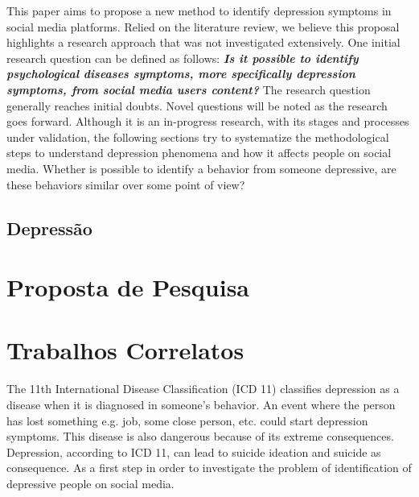 \documentclass[11pt, notitlepage]{article} %
\begin{document}
This paper aims to propose a new method to identify depression symptoms in social media platforms. Relied on the literature review, we believe this proposal highlights a research approach that was not investigated extensively.
One initial research question can be defined as follows: \textbf{\emph{Is it possible to identify psychological diseases symptoms, more specifically depression symptoms, from social media users content?}} The research question generally reaches initial doubts. Novel questions will be noted as the research goes forward.
Although it is an in-progress research, with its stages and processes under validation, the following sections try to systematize the methodological steps to understand depression phenomena and how it affects people on social media.
Whether is possible to identify a behavior from someone depressive, are these behaviors similar over some point of view? 

\subsection*{Depressão}

\section*{Proposta de Pesquisa}

\section*{Trabalhos Correlatos}
The 11th International Disease Classification (ICD 11) classifies depression as a disease when it is diagnosed in someone’s behavior. An event where the person has lost something e.g. job, some close person, etc. could start depression symptoms. This disease is also dangerous because of its extreme consequences. Depression, according to ICD 11, can lead to suicide ideation and suicide as consequence\cite{american2013diagnostic}.
As a first step in order to investigate the problem of identification of depressive people on social media.
\end{document}
